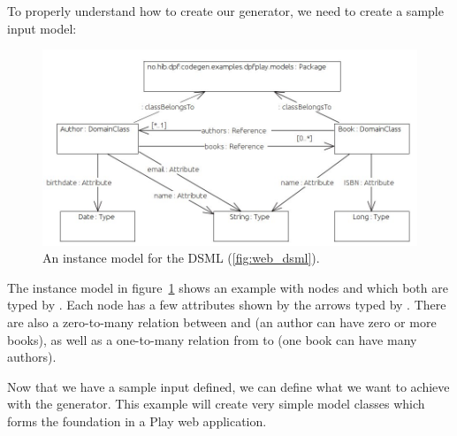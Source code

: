 To properly understand how to create our generator, we need to create a sample input model:
\begin{figure}[h]
  \centering
  \centerline{\includegraphics[scale=0.5]{images/dsml_instance.jpeg}}
  \caption[Sample instance model for dpfplay]{An instance model for the DSML (\ref{fig:web_dsml}).}
  \label{fig:web_instance}
\end{figure}

The instance model in figure~\ref{fig:web_instance} shows an example with nodes  and  which both are typed by . Each node has a few attributes shown by the arrows typed by . There are also a zero-to-many relation between  and  (an author can have zero or more books), as well as a one-to-many relation from  to  (one book can have many authors).

Now that we have a sample input defined, we can define what we want to achieve with the generator. This example will create very simple model classes which forms the foundation in a Play web application. 

